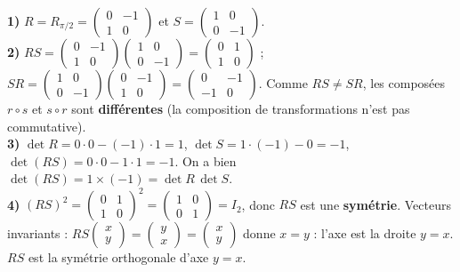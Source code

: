 \textbf{1)} $R=R_{\pi/2}=\begin{pmatrix}0&-1\\1&0\end{pmatrix}$ et $S=\begin{pmatrix}1&0\\0&-1\end{pmatrix}$.\\
\textbf{2)} $RS=\begin{pmatrix}0&-1\\1&0\end{pmatrix}\begin{pmatrix}1&0\\0&-1\end{pmatrix}
=\begin{pmatrix}0&1\\1&0\end{pmatrix}$ ;\
$SR=\begin{pmatrix}1&0\\0&-1\end{pmatrix}\begin{pmatrix}0&-1\\1&0\end{pmatrix}
=\begin{pmatrix}0&-1\\-1&0\end{pmatrix}$. Comme $RS\neq SR$, les composées $r\circ s$ et $s\circ r$
sont \textbf{différentes} (la composition de transformations n'est pas commutative).\\
\textbf{3)} $\det R=0\cdot0-(-1)\cdot1=1$, $\det S=1\cdot(-1)-0=-1$,
$\det(RS)=0\cdot0-1\cdot1=-1$. On a bien $\det(RS)=1\times(-1)=\det R\,\det S$.\\
\textbf{4)} $(RS)^2=\begin{pmatrix}0&1\\1&0\end{pmatrix}^2=\begin{pmatrix}1&0\\0&1\end{pmatrix}=I_2$,
donc $RS$ est une \textbf{symétrie}. Vecteurs invariants : $RS\begin{pmatrix}x\\y\end{pmatrix}
=\begin{pmatrix}y\\x\end{pmatrix}=\begin{pmatrix}x\\y\end{pmatrix}$ donne $x=y$ : l'axe est la
droite $y=x$. $RS$ est la symétrie orthogonale d'axe $y=x$.
